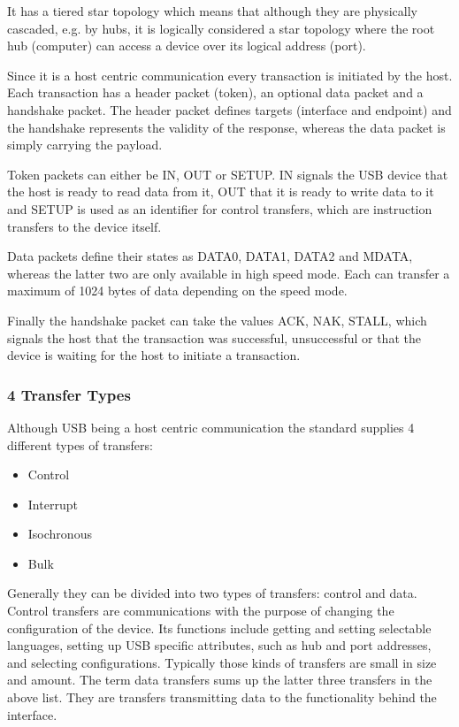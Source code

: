 It has a tiered star topology which means that although they are physically cascaded, e.g. by hubs, it is logically considered a star topology where the 
root hub (computer) can access a device over its logical address (port).
\begin{figure}

\end{figure}

Since it is a host centric communication every transaction is initiated by the host. Each transaction has a header packet (token), an optional data 
packet and a handshake packet. The header packet defines targets (interface and endpoint) and the handshake represents the validity of the response, 
whereas the data packet is simply carrying the payload.

Token packets can either be IN, OUT or SETUP. IN signals the USB device that the host is ready to read data from it, OUT that it is ready to write data 
to it and SETUP is used as an identifier for control transfers, which are instruction transfers to the device itself.

Data packets define their states as DATA0, DATA1, DATA2 and MDATA, whereas the latter two are only available in high speed mode. Each can transfer a 
maximum of 1024 bytes of data depending on the speed mode.

Finally the handshake packet can take the values ACK, NAK, STALL, which signals the host that the transaction was successful, unsuccessful or that the 
device is waiting for the host to initiate a transaction.%

\subsubsection{4 Transfer Types}

Although USB being a host centric communication the standard supplies 4 different types of transfers: 

\begin{itemize}
 \item Control
 \item Interrupt
 \item Isochronous
 \item Bulk
\end{itemize}

Generally they can be divided into two types of transfers: control and data. Control transfers are communications with the purpose of changing the 
configuration of the device. Its functions include getting and setting selectable languages, setting up USB specific attributes, such as hub and port 
addresses, and selecting configurations. Typically those kinds of transfers are small in size and amount. 
The term data transfers sums up the latter three transfers in the above list. They are transfers transmitting data to the functionality 
behind the interface.%

